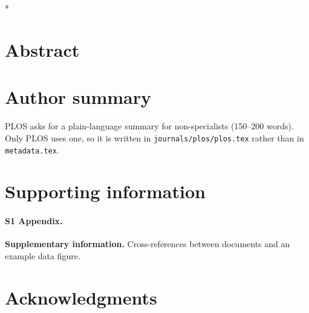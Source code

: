 \documentclass[10pt,letterpaper]{article}
\makeatletter
\def\plos@emails{}
\newcommand{\paperemails}{{\def\plos@esep{}\plos@emails}}
\makeatother
\begin{document}
\vspace*{0.2in}

\begin{flushleft}
{\Large
\textbf{\papertitle}
}
\newline
\\
\paperauthors
\\
\bigskip
\paperaffiliations
\bigskip
* \paperemails
\end{flushleft}

\section*{Abstract}
\paperabstract

\section*{Author summary}
PLOS asks for a plain-language summary for non-specialists (150--200 words).
Only PLOS uses one, so it is written in \texttt{journals/plos/plos.tex} rather
than in \texttt{metadata.tex}.

\linenumbers



\section*{Supporting information}
\paragraph*{S1 Appendix.}
\textbf{Supplementary information.} Cross-references between documents and an
example data figure.

\section*{Acknowledgments}
\paperacknowledgements


\end{document}
